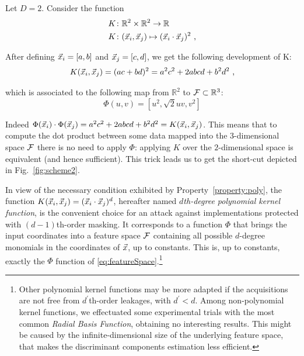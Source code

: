 \begin{example}\label{ex:polyKernel}
Let $D=2$. Consider the function
\begin{align}
&K\colon\mathbb{R}^2\times \mathbb{R}^2 \rightarrow \mathbb{R} \nonumber \\ 
&K\colon(\vec{x}_i,\vec{x}_j) \mapsto ( \vec{x}_i\cdot \vec{x}_j)^2 \mbox{ ,} \label{eq:example1}
\end{align}

After defining $\vec{x}_i = [a,b]$ and $\vec{x}_j = [c,d]$, we get the following development of K:
\begin{equation}
K(\vec{x}_i,\vec{x}_j) = (ac + bd)^2 = a^2c^2 + 2abcd + b^2d^2 \mbox{ ,}
\end{equation}

which is associated to the following map from $\mathbb{R}^2$ to $\mathcal{F} \subset\mathbb{R}^3$:
\begin{equation}
\Phi(u,v) =  [u^2, \sqrt{2}uv, v^2]
\end{equation}

Indeed $\Phi(\vec{x}_i)\cdot \Phi(\vec{x}_j) = a^2c^2 + 2abcd + b^2d^2 = K(\vec{x}_i,\vec{x}_j)$\enspace. This means that to compute the dot product between some data mapped into the $3$-dimensional space $\mathcal{F}$ there is no need to apply $\Phi$: applying $K$ over the $2$-dimensional space is equivalent (and hence sufficient). This trick leads us to get the short-cut depicted in Fig.~\ref{fig:scheme2}.

\end{example}



In view of the necessary condition exhibited by Property~\ref{property:poly},  the function $K(\vec{x}_i,\vec{x}_j) = (\vec{x}_i \cdot \vec{x}_j)^d$, hereafter named \emph{$d$th-degree polynomial kernel function}, is the convenient choice for an attack against implementations protected with $(d-1)$th-order masking. It corresponds to a function $\Phi$ that brings the input coordinates into a feature space $\mathcal{F}$ containing all possible $d$-degree monomials in the coordinates of $\vec{x}$, up to constants. This is, up to constants, exactly the $\Phi$ function of \eqref{eq:featureSpace}.\footnote{Other polynomial kernel functions may be more adapted if the acquisitions are not free from $d^\prime$th-order leakages, with $d^\prime<d$. Among non-polynomial kernel functions, we effectuated some experimental trials with the most common \emph{Radial Basis Function}, obtaining no interesting results. This might be caused by the infinite-dimensional size of the underlying feature space, that makes the discriminant components estimation less efficient.}\\ 

